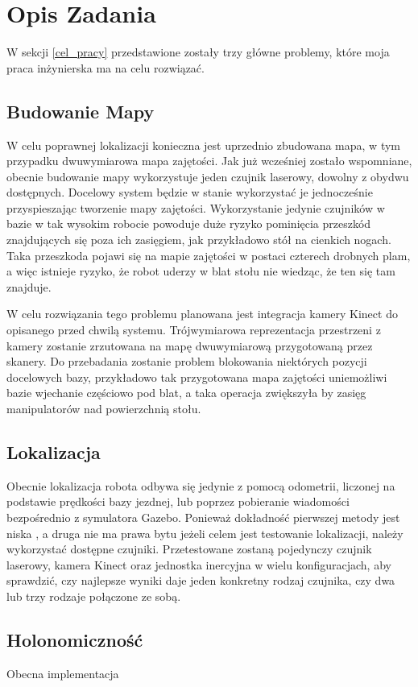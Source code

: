 \section{Opis Zadania}
\label{opis_zadania}

W sekcji \ref{cel_pracy} przedstawione zostały trzy główne problemy, które moja praca inżynierska ma na celu rozwiązać.

\subsection{Budowanie Mapy}

	W celu poprawnej lokalizacji konieczna jest uprzednio zbudowana mapa, w tym przypadku dwuwymiarowa mapa zajętości. 
	Jak już wcześniej zostało wspomniane, obecnie budowanie mapy wykorzystuje jeden czujnik laserowy, dowolny z obydwu dostępnych. 
	Docelowy system będzie w stanie wykorzystać je jednocześnie przyspieszając tworzenie mapy zajętości.
	Wykorzystanie jedynie czujników w bazie w tak wysokim robocie powoduje duże ryzyko pominięcia przeszkód znajdujących się poza ich zasięgiem, jak przykładowo stół na cienkich nogach.
	Taka przeszkoda pojawi się na mapie zajętości w postaci czterech drobnych plam, a więc istnieje ryzyko, że robot uderzy w blat stołu nie wiedząc, że ten się tam znajduje.



	W celu rozwiązania tego problemu planowana jest integracja kamery Kinect do opisanego przed chwilą systemu. 
	Trójwymiarowa reprezentacja przestrzeni z kamery zostanie zrzutowana na mapę dwuwymiarową przygotowaną przez skanery.
	Do przebadania zostanie problem blokowania niektórych pozycji docelowych bazy, przykładowo tak przygotowana mapa zajętości uniemożliwi bazie wjechanie częściowo pod blat, a taka operacja zwiększyła by zasięg manipulatorów nad powierzchnią stołu.

\subsection{Lokalizacja}


	Obecnie lokalizacja robota odbywa się jedynie z pomocą odometrii, liczonej na podstawie prędkości bazy jezdnej, lub poprzez pobieranie wiadomości bezpośrednio z symulatora Gazebo.
	Ponieważ dokładność pierwszej metody jest niska \cite{jsikora-bsc-20-twiki}, a druga nie ma prawa bytu jeżeli celem jest testowanie lokalizacji, należy wykorzystać dostępne czujniki.
	Przetestowane zostaną pojedynczy czujnik laserowy, kamera Kinect oraz jednostka inercyjna w wielu konfiguracjach, aby sprawdzić, czy najlepsze wyniki daje jeden konkretny rodzaj czujnika, czy dwa lub trzy rodzaje połączone ze sobą.

\subsection{Holonomiczność}

	Obecna implementacja